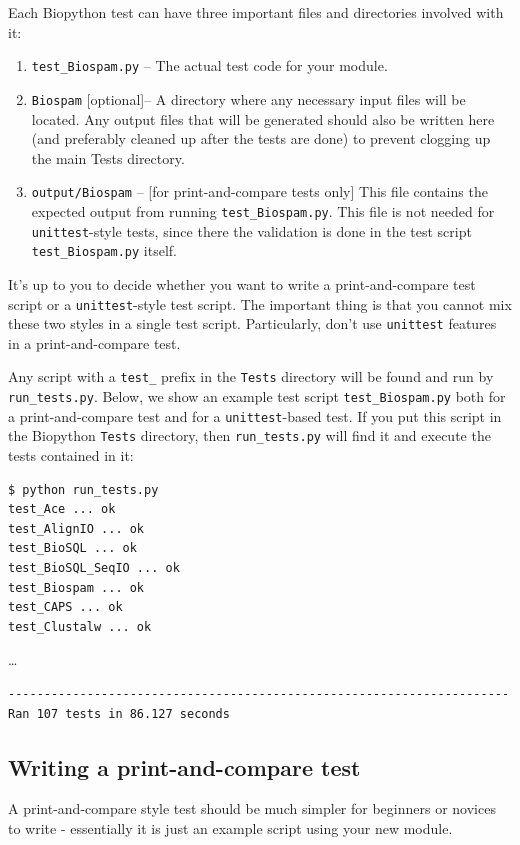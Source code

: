\documentclass{report}
\begin{document}
Each Biopython test can have three important files and directories involved with it:

\begin{enumerate}
  \item \verb|test_Biospam.py| -- The actual test code for your module.
  \item \verb|Biospam| [optional]-- A directory where any necessary input files
    will be located. Any output files that will be generated should also
    be written here (and preferably cleaned up after the tests are
    done) to prevent clogging up the main Tests directory.
  \item \verb|output/Biospam| -- [for print-and-compare tests only] This
    file contains the expected output from running \verb|test_Biospam.py|.
    This file is not needed for \verb|unittest|-style tests, since there
    the validation is done in the test script \verb|test_Biospam.py| itself.
\end{enumerate}

It's up to you to decide whether you want to write a print-and-compare test script or a \verb|unittest|-style test script. The important thing is that you cannot mix these two styles in a single test script. Particularly, don't use \verb|unittest| features in a print-and-compare test.

Any script with a \verb|test_| prefix in the \verb|Tests| directory will be found and run by \verb|run_tests.py|. Below, we show an example test script \verb|test_Biospam.py| both for a print-and-compare test and for a \verb|unittest|-based test. If you put this script in the Biopython \verb|Tests| directory, then \verb|run_tests.py| will find it and execute the tests contained in it:
\begin{verbatim}
$ python run_tests.py     
test_Ace ... ok
test_AlignIO ... ok
test_BioSQL ... ok
test_BioSQL_SeqIO ... ok
test_Biospam ... ok
test_CAPS ... ok
test_Clustalw ... ok
\end{verbatim}
\ldots
\begin{verbatim}
----------------------------------------------------------------------
Ran 107 tests in 86.127 seconds
\end{verbatim}

\subsection{Writing a print-and-compare test}

A print-and-compare style test should be much simpler for beginners
or novices to write - essentially it is just an example script using
your new module.
\end{document}

